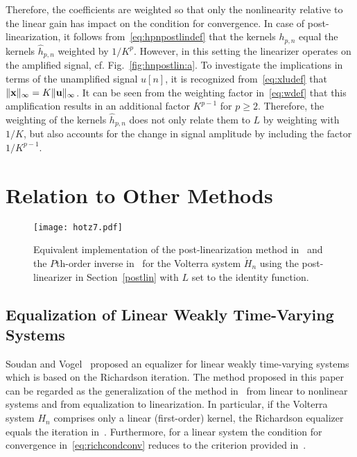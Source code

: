 \documentclass[10pt,twocolumn,twoside]{IEEEtran}
\begin{document}
Therefore, the coefficients are weighted so that only the nonlinearity
relative to the linear gain has impact on the condition for convergence.
In case of post-linearization, it follows from~\eqref{eq:hpnpostlindef} that the
kernels $h_{p,n}$ equal the kernels $\hat{h}_{p,n}$ weighted by $1/K^p$.
However, in this setting the linearizer operates on the amplified signal,
cf. Fig.~\ref{fig:hnpostlin:a}. To investigate the implications in terms
of the unamplified signal $u[n]$, it is recognized from~\eqref{eq:xludef}
that $\lVert\bm{\mathrm{x}}\rVert_\infty=K\lVert\bm{\mathrm{u}}\rVert_\infty$. It can be seen from the
weighting factor in~\eqref{eq:wdef} that this amplification results in
an additional factor $K^{p-1}$ for $p\geq 2$. Therefore, the weighting
of the kernels $\hat{h}_{p,n}$ does not only relate them to $L$ by
weighting with $1/K$, but also accounts for the change in signal amplitude by
including the factor $1/K^{p-1}$.


\section{Relation to Other Methods}
	\label{relation}

\begin{figure}[!t]
	\centering
	\texttt{[image: hotz7.pdf]}
	\caption{
		Equivalent implementation of the post-linearization method in~\cite{nowak1997}
		and the $P$th-order inverse in~\cite{kafka2002} for the Volterra system
		$\mathring{H}_n$ using the post-linearizer in Section~\ref{postlin} with
		$L$ set to the identity function.}
	\label{fig:nowakvsrich}
\end{figure}


\subsection{Equalization of Linear Weakly Time-Varying Systems}
	\label{relation:ltveq}

Soudan and Vogel~\cite{soudan2012} proposed an equalizer for linear weakly time-varying systems
which is based on the Richardson iteration. The method proposed in this paper
can be regarded as the generalization of the method in~\cite{soudan2012} from linear
to nonlinear systems and from equalization to linearization. In particular, if the
Volterra system $H_n$ comprises only a linear (first-order) kernel, the
Richardson equalizer equals the iteration in~\cite{soudan2012}. Furthermore,
for a linear system the condition for convergence in~\eqref{eq:richcondconv} reduces to the
criterion provided in~\cite{soudan2012}.
\end{document}
